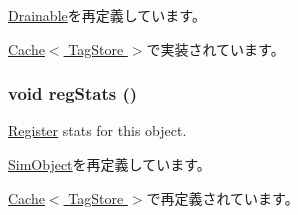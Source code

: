 \hyperlink{classDrainable_aaec8b1741246cef384bc2743ce21cc34}{Drainable}を再定義しています。

\hyperlink{classCache_a381272ae5c2cc173adb59cd67a76b458}{Cache$<$ TagStore $>$}で実装されています。\hypertarget{classBaseCache_a4dc637449366fcdfc4e764cdf12d9b11}{
\subsubsection[{regStats}]{\setlength{\rightskip}{0pt plus 5cm}void regStats ()}}
\label{classBaseCache_a4dc637449366fcdfc4e764cdf12d9b11}
\hyperlink{classRegister}{Register} stats for this object. 

\hyperlink{classSimObject_a4dc637449366fcdfc4e764cdf12d9b11}{SimObject}を再定義しています。

\hyperlink{classCache_a4dc637449366fcdfc4e764cdf12d9b11}{Cache$<$ TagStore $>$}で再定義されています。


